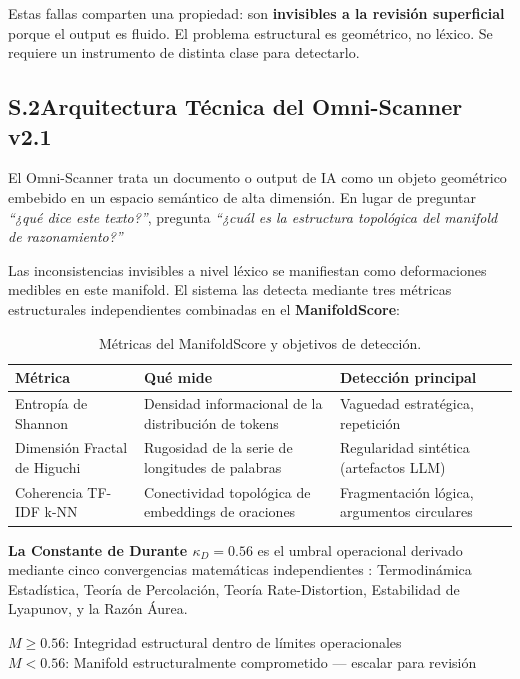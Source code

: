 \documentclass[11pt, a4paper]{article}
\begin{document}
Estas fallas comparten una propiedad: son \textbf{invisibles a la revisión
superficial} porque el output es fluido. El problema estructural es geométrico,
no léxico. Se requiere un instrumento de distinta clase para detectarlo.

\subsection*{S.2\quad Arquitectura Técnica del Omni-Scanner v2.1}

El Omni-Scanner trata un documento o output de IA como un objeto geométrico
embebido en un espacio semántico de alta dimensión. En lugar de preguntar
\emph{``¿qué dice este texto?''}, pregunta
\emph{``¿cuál es la estructura topológica del manifold de razonamiento?''}

Las inconsistencias invisibles a nivel léxico se manifiestan como deformaciones
medibles en este manifold. El sistema las detecta mediante tres métricas
estructurales independientes combinadas en el \textbf{ManifoldScore}:

\begin{table}[H]
\centering
\caption{Métricas del ManifoldScore y objetivos de detección.}
\begin{tabular}{p{3.8cm} p{5.2cm} p{4.6cm}}
\toprule
\textbf{Métrica} & \textbf{Qué mide} & \textbf{Detección principal} \\
\midrule
Entropía de Shannon & Densidad informacional de la distribución de tokens &
  Vaguedad estratégica, repetición \\
Dimensión Fractal de Higuchi & Rugosidad de la serie de longitudes de palabras &
  Regularidad sintética (artefactos LLM) \\
Coherencia TF-IDF k-NN & Conectividad topológica de embeddings de oraciones &
  Fragmentación lógica, argumentos circulares \\
\bottomrule
\end{tabular}
\end{table}

\textbf{La Constante de Durante $\kappa_D = 0.56$} es el umbral operacional
derivado mediante cinco convergencias matemáticas independientes \cite{durante2026manifold}:
Termodinámica Estadística, Teoría de Percolación, Teoría Rate-Distortion,
Estabilidad de Lyapunov, y la Razón Áurea.

\begin{statbox}
\centering
$M \geq 0.56$\;: Integridad estructural dentro de límites operacionales\\[4pt]
$M < 0.56$\;: Manifold estructuralmente comprometido --- escalar para revisión
\end{statbox}
\end{document}
